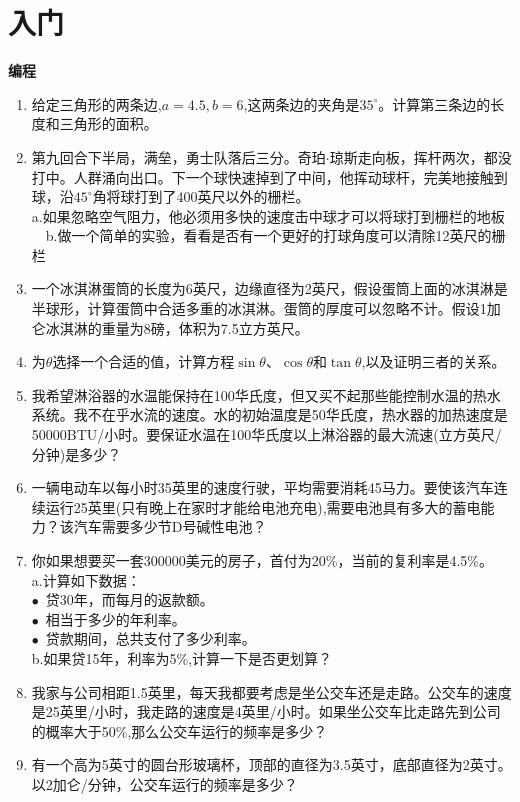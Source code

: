 \documentclass[UTF8]{ctexart}
\begin{document}
\section{入门}
\textbf{编程}\\
\begin{enumerate}
	\item 给定三角形的两条边,$a=4.5,b=6$,这两条边的夹角是$35^{\circ}。$计算第三条边的长度和三角形的面积。
	\item 第九回合下半局，满垒，勇士队落后三分。奇珀$\cdot$琼斯走向板，挥杆两次，都没打中。人群涌向出口。下一个球快速掉到了中间，他挥动球杆，完美地接触到球，沿$45^{\circ}$角将球打到了400英尺以外的栅栏。\\
	a.如果忽略空气阻力，他必须用多快的速度击中球才可以将球打到栅栏的地板
	\ \ b.做一个简单的实验，看看是否有一个更好的打球角度可以清除12英尺的栅栏
	\item 一个冰淇淋蛋筒的长度为6英尺，边缘直径为2英尺，假设蛋筒上面的冰淇淋是半球形，计算蛋筒中合适多重的冰淇淋。蛋筒的厚度可以忽略不计。假设1加仑冰淇淋的重量为8磅，体积为7.5立方英尺。
	\item 为$\theta$选择一个合适的值，计算方程$\sin\theta$、$\cos\theta$和$\tan\theta$,以及证明三者的关系。
	\item 我希望淋浴器的水温能保持在100华氏度，但又买不起那些能控制水温的热水系统。我不在乎水流的速度。水的初始温度是50华氏度，热水器的加热速度是50000BTU/小时。要保证水温在100华氏度以上淋浴器的最大流速(立方英尺/分钟)是多少？
	\item 一辆电动车以每小时35英里的速度行驶，平均需要消耗45马力。要使该汽车连续运行25英里(只有晚上在家时才能给电池充电),需要电池具有多大的蓄电能力？该汽车需要多少节D号碱性电池？
	\item 你如果想要买一套300000美元的房子，首付为20\%，当前的复利率是4.5\%。\\
	a.计算如下数据：\\
	$\bullet$ \,贷30年，而每月的返款额。\\
	$\bullet$ \,相当于多少的年利率。\\
	$\bullet$ \,贷款期间，总共支付了多少利率。\\
	b.如果贷15年，利率为5\%,计算一下是否更划算？
	\item 我家与公司相距1.5英里，每天我都要考虑是坐公交车还是走路。公交车的速度是25英里/小时，我走路的速度是4英里/小时。如果坐公交车比走路先到公司的概率大于50\%,那么公交车运行的频率是多少？
	\item 有一个高为5英寸的圆台形玻璃杯，顶部的直径为3.5英寸，底部直径为2英寸。以2加仑/分钟，公交车运行的频率是多少？

\end{enumerate}
\end{document}
